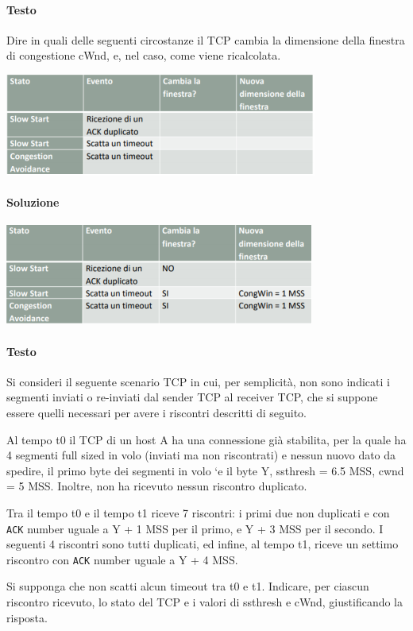 \documentclass[10pt]{article}
\begin{document}
\paragraph{Testo} Dire in quali delle seguenti circostanze il TCP cambia la dimensione della finestra di congestione cWnd, e, nel caso, come viene ricalcolata.
\begin{center}
\includegraphics[scale=1]{es_tcp8testo.png}
\end{center}
\paragraph{Soluzione}
\begin{center}
\includegraphics[scale=1]{es_tcp8.png}
\end{center}
\pagebreak
\paragraph{Testo} Si consideri il seguente scenario TCP in cui, per semplicità, non sono indicati i segmenti inviati o re-inviati dal sender TCP al receiver TCP, che si suppone essere quelli necessari per avere i riscontri descritti di seguito.
\begin{list}{-}{}
\item Al tempo t0 il TCP di un host A ha una connessione già stabilita, per la quale ha 4 segmenti full sized in volo (inviati ma non riscontrati) e nessun nuovo dato da spedire, il primo byte dei segmenti in volo `e il byte Y, ssthresh = 6.5 MSS, cwnd = 5 MSS. Inoltre, non ha ricevuto nessun riscontro duplicato.
\item Tra il tempo t0 e il tempo t1 riceve 7 riscontri: i primi due non duplicati e con \texttt{ACK} number uguale a Y + 1 MSS per il primo, e Y + 3 MSS per il secondo. I seguenti 4 riscontri sono tutti duplicati, ed infine, al tempo t1, riceve un settimo riscontro con \texttt{ACK} number uguale a Y + 4 MSS.
\end{list}
Si supponga che non scatti alcun timeout tra t0 e t1. Indicare, per ciascun riscontro ricevuto, lo stato del TCP e i valori di ssthresh e cWnd, giustificando la risposta.
\end{document}
